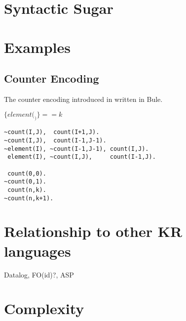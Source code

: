 \documentclass{article}
\begin{document}
\section{Syntactic Sugar}

\section{Examples}

\subsection{Counter Encoding}

The counter encoding introduced in \cite{sinz2005} written in Bule. 

$\{ element(_) \} == k$

\begin{lstlisting}
~count(I,J),  count(I+1,J).
~count(I,J),  count(I-1,J-1).
~element(I), ~count(I-1,J-1), count(I,J).
 element(I), ~count(I,J),     count(I-1,J).

 count(0,0).
~count(0,1).
 count(n,k).
~count(n,k+1).
\end{lstlisting}

\section{Relationship to other KR languages}

Datalog, FO(id)?, ASP

\section{Complexity}



\end{document}
